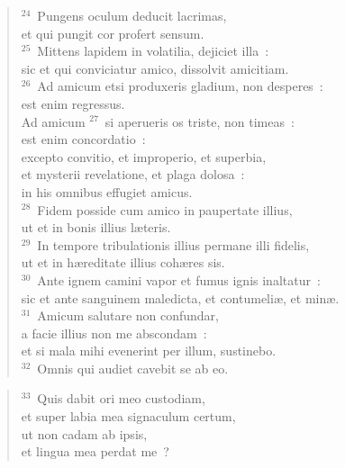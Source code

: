 \begin{flushleft}\begin{verse}${}^{24}$~Pungens oculum deducit lacrimas,\\ et qui pungit cor profert sensum.\\
${}^{25}$~Mittens lapidem in volatilia, dejiciet illa~:\\ sic et qui conviciatur amico, dissolvit amicitiam.\\
${}^{26}$~Ad amicum etsi produxeris gladium, non desperes~:\\ est enim regressus.\\ Ad amicum
${}^{27}$~si aperueris os triste, non timeas~:\\ est enim concordatio~:\\ excepto convitio, et improperio, et superbia,\\ et mysterii revelatione, et plaga dolosa~:\\ in his omnibus effugiet amicus.\\
${}^{28}$~Fidem posside cum amico in paupertate illius,\\ ut et in bonis illius l\ae teris.\\
${}^{29}$~In tempore tribulationis illius permane illi fidelis,\\ ut et in h\ae reditate illius coh\ae res sis.\\
${}^{30}$~Ante ignem camini vapor et fumus ignis inaltatur~:\\ sic et ante sanguinem maledicta, et contumeli\ae , et min\ae .\\
${}^{31}$~Amicum salutare non confundar,\\ a facie illius non me abscondam~:\\ et si mala mihi evenerint per illum, sustinebo.\\
${}^{32}$~Omnis qui audiet cavebit se ab eo.\end{verse}\end{flushleft}


\begin{flushleft}\begin{verse}${}^{33}$~Quis dabit ori meo custodiam,\\ et super labia mea signaculum certum,\\ ut non cadam ab ipsis,\\ et lingua mea perdat me~?\end{verse}\end{flushleft}


